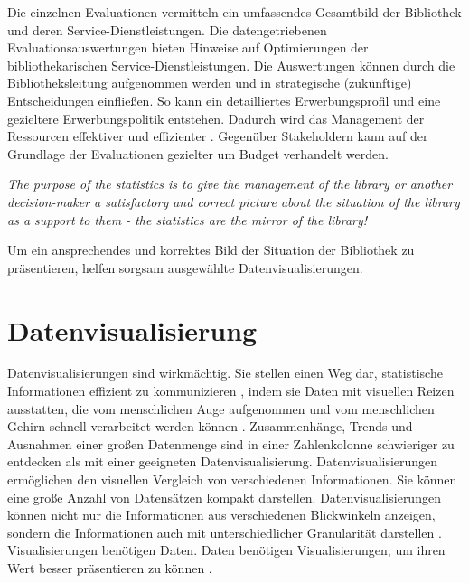 Die einzelnen Evaluationen vermitteln ein umfassendes Gesamtbild der Bibliothek und deren Service-Dienstleistungen. 
Die datengetriebenen Evaluationsauswertungen bieten Hinweise auf Optimierungen der bibliothekarischen Service-Dienstleistungen. 
Die Auswertungen können durch die Bibliotheksleitung aufgenommen werden und in strategische (zukünftige) Entscheidungen einfließen. 
So kann ein detailliertes Erwerbungsprofil und eine gezieltere Erwerbungspolitik entstehen. 
Dadurch wird das Management der Ressourcen effektiver und effizienter \cite[vgl.][297]{johnson_peggy_fundamentals_2014}.
Gegenüber Stakeholdern kann auf der Grundlage der Evaluationen gezielter um Budget verhandelt werden.
\begin{displayquote}
    \textit{The purpose of the statistics is to give the management of the library or another decision-maker 
    a satisfactory and correct picture about the situation of the library as a support to them - the statistics are the mirror of the library!}
    \cite[463]{laitinen_markku_library_2013}
\end{displayquote}

Um ein ansprechendes und korrektes Bild der Situation der Bibliothek zu präsentieren, helfen sorgsam ausgewählte Datenvisualisierungen.



\clearpage

\section{Datenvisualisierung}
\label{chap:two_two}
Datenvisualisierungen sind wirkmächtig. Sie stellen einen Weg dar, statistische Informationen effizient zu kommunizieren \cite[vgl.][15]{Tufte01}, 
indem sie Daten mit visuellen Reizen ausstatten, die vom menschlichen Auge aufgenommen und vom menschlichen Gehirn schnell verarbeitet werden können \cite[vgl.][32]{few_now_2009}. 
Zusammenhänge, Trends und Ausnahmen einer großen Datenmenge sind in einer Zahlenkolonne schwieriger zu entdecken als mit einer geeigneten Datenvisualisierung.
Datenvisualisierungen ermöglichen den visuellen Vergleich von verschiedenen Informationen. Sie können eine große Anzahl von Datensätzen kompakt darstellen. 
Datenvisualisierungen können nicht nur die Informationen aus verschiedenen Blickwinkeln anzeigen, sondern die Informationen auch
mit unterschiedlicher Granularität darstellen \cite[vgl.][245]{muller_business_2013}.
Visualisierungen benötigen Daten. Daten benötigen Visualisierungen, um ihren Wert besser präsentieren zu können \cite[vgl.][16]{kirk_data_2019}.


